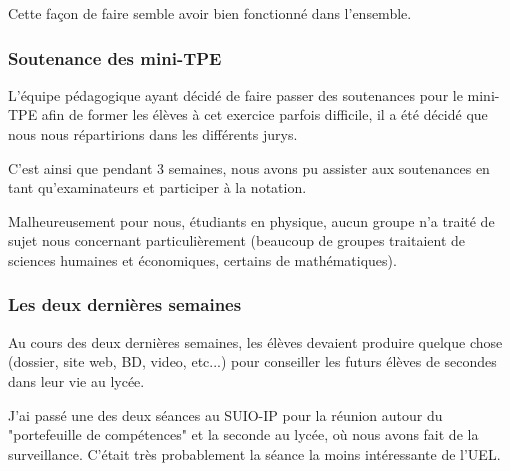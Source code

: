 Cette façon de faire semble avoir bien fonctionné dans l'ensemble.

\subsubsection{Soutenance des mini-TPE}

L'équipe pédagogique ayant décidé de faire passer des soutenances pour le mini-TPE afin de former les élèves à cet
exercice parfois difficile, il a été décidé que nous nous répartirions dans les différents jurys.

C'est ainsi que pendant 3 semaines, nous avons pu assister aux soutenances en tant qu'examinateurs et participer à la
notation.

Malheureusement pour nous, étudiants en physique, aucun groupe n'a traité de sujet nous concernant particulièrement
(beaucoup de groupes traitaient de sciences humaines et économiques, certains de mathématiques).

\subsubsection{Les deux dernières semaines}

Au cours des deux dernières semaines, les élèves devaient produire quelque chose (dossier, site web, BD, video, etc...)
pour conseiller les futurs élèves de secondes dans leur vie au lycée.

J'ai passé une des deux séances au SUIO-IP pour la réunion autour du "portefeuille de compétences" et la seconde au
lycée, où nous avons fait de la surveillance. C'était très probablement la séance la moins intéressante de l'UEL.
